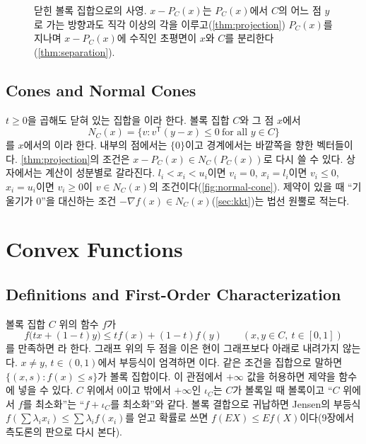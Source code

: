 \begin{figure}[htbp]
\centering
{}
\caption{닫힌 볼록 집합으로의 사영. $x-P_C(x)$는 $P_C(x)$에서 $C$의 어느 점 $y$로 가는 방향과도 직각 이상의 각을 이루고(\cref{thm:projection}) $P_C(x)$를 지나며 $x-P_C(x)$에 수직인 초평면이 $x$와 $C$를 분리한다(\cref{thm:separation}).}
\label{fig:projection}
\end{figure}

\subsection{Cones and Normal Cones}

$t\ge0$을 곱해도 닫혀 있는 집합을 이라 한다. 볼록 집합 $C$와 그 점 $x$에서
\[
N_C(x)=\{v:v^{\mathsf T}(y-x)\le0\ \text{for all }y\in C\}
\]
를 $x$에서의 이라 한다. 내부의 점에서는 $\{0\}$이고 경계에서는 바깥쪽을 향한 벡터들이다. \cref{thm:projection}의 조건은 $x-P_C(x)\in N_C(P_C(x))$로 다시 쓸 수 있다. 상자에서는 계산이 성분별로 갈라진다. $l_i<x_i<u_i$이면 $v_i=0$, $x_i=l_i$이면 $v_i\le0$, $x_i=u_i$이면 $v_i\ge0$이 $v\in N_C(x)$의 조건이다(\cref{fig:normal-cone}). 제약이 있을 때 ``기울기가 $0$''을 대신하는 조건 $-\nabla f(x)\in N_C(x)$(\cref{sec:kkt})는 법선 원뿔로 적는다.

\section{Convex Functions}
\label{sec:convex-functions}

\subsection{Definitions and First-Order Characterization}

볼록 집합 $C$ 위의 함수 $f$가
\[
f\bigl(tx+(1-t)y\bigr)\le tf(x)+(1-t)f(y)\qquad(x,y\in C,\ t\in[0,1])
\]
를 만족하면 라 한다. 그래프 위의 두 점을 이은 현이 그래프보다 아래로 내려가지 않는다. $x\ne y$, $t\in(0,1)$에서 부등식이 엄격하면 이다. 같은 조건을 집합으로 말하면  $\{(x,s):f(x)\le s\}$가 볼록 집합이다. 이 관점에서 $+\infty$ 값을 허용하면 제약을 함수에 넣을 수 있다. $C$ 위에서 $0$이고 밖에서 $+\infty$인  $\iota_C$는 $C$가 볼록일 때 볼록이고 ``$C$ 위에서 $f$를 최소화''는 ``$f+\iota_C$를 최소화''와 같다. 볼록 결합으로 귀납하면 Jensen의 부등식 $f(\sum\lambda_ix_i)\le\sum\lambda_if(x_i)$를 얻고 확률로 쓰면 $f(EX)\le Ef(X)$이다(9장에서 측도론의 판으로 다시 본다).

